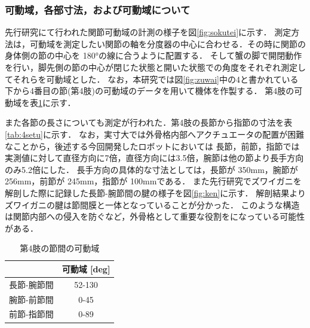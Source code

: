 \subsubsection{可動域，各部寸法，および可動域について}
先行研究\cite{hasegawa}にて行われた関節可動域の計測の様子を図\ref{fig:sokutei}に示す．
測定方法は，可動域を測定したい関節の軸を分度器の中心に合わせる．その時に関節の身体側の節の中心を 180°の線に合うように配置する．
そして蟹の脚で開閉動作を行い，脚先側の節の中心が閉じた状態と開いた状態での角度をそれぞれ測定してそれらを可動域とした．
なお，本研究では図\ref{fig:zuwai}中の4と書かれている下から4番目の節(第4肢)の可動域のデータを用いて機体を作製する．
第4肢の可動域を表\ref{tab:4setukadou}に示す．

また各節の長さについても測定が行われた．第4肢の長節から指節の寸法を表\ref{tab:4setu}に示す．
なお，実寸大では外骨格内部へアクチュエータの配置が困難なことから，後述する今回開発したロボットにおいては
長節，前節，指節では実測値に対して直径方向に7倍，直径方向には3.5倍，腕節は他の節より長手方向のみ5.2倍にした．
長手方向の具体的な寸法としては，長節が 350mm，腕節が 256mm，前節が 245mm，指節が 100mmである．
また先行研究\cite{hasegawa}でズワイガニを解剖した際に記録した長節-腕節間の腱の様子を図\ref{fig:ken}に示す．
解剖結果よりズワイガニの腱は節間膜と一体となっていることが分かった\cite{hasegawa}．
このような構造は関節内部への侵入を防ぐなど，外骨格として重要な役割をになっている可能性がある．
\begin{table}[t]
  \centering
  \vspace{5mm}
  \caption{第4肢の節間の可動域}
  \label{tab:4setukadou}
  \vspace{-3mm}
  \begin{tabular}{|l|c|}
  \hline
         & \multicolumn{1}{l|}{可動域 {[}deg{]}} \\ \hline
  長節-腕節間 & 52-130                            \\ \hline
  腕節-前節間 & 0-45                             \\ \hline
  前節-指節間 & 0-89                            \\ \hline
  \end{tabular}
\end{table}
